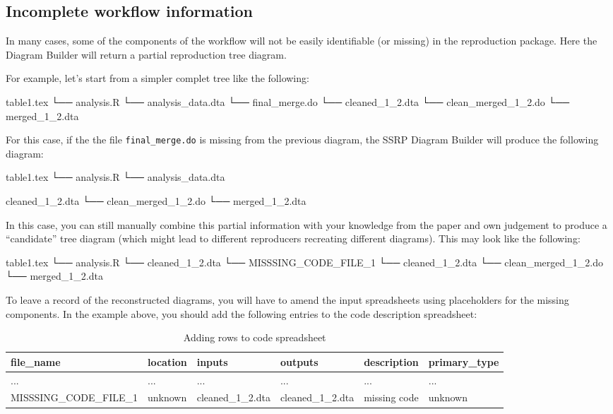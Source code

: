 \documentclass[
]{book}
\begin{document}
\hypertarget{incomplete-workflow-information}{%
\subsection{Incomplete workflow information}\label{incomplete-workflow-information}}

In many cases, some of the components of the workflow will not be easily identifiable (or missing) in the reproduction package. Here the Diagram Builder will return a partial reproduction tree diagram.

For example, let's start from a simpler complet tree like the following:

table1.tex
└── analysis.R
└── analysis\_data.dta
└── final\_merge.do
└── cleaned\_1\_2.dta
└── clean\_merged\_1\_2.do
└── merged\_1\_2.dta

For this case, if the the file \texttt{final\_merge.do} is missing from the previous diagram, the SSRP Diagram Builder will produce the following diagram:

table1.tex
└── analysis.R
└── analysis\_data.dta

cleaned\_1\_2.dta
└── clean\_merged\_1\_2.do
└── merged\_1\_2.dta

In this case, you can still manually combine this partial information with your knowledge from the paper and own judgement to produce a ``candidate'' tree diagram (which might lead to different reproducers recreating different diagrams). This may look like the following:

table1.tex
└── analysis.R
└── cleaned\_1\_2.dta
└── MISSSING\_CODE\_FILE\_1
└── cleaned\_1\_2.dta
└── clean\_merged\_1\_2.do
└── merged\_1\_2.dta

To leave a record of the reconstructed diagrams, you will have to amend the input spreadsheets using placeholders for the missing components. In the example above, you should add the following entries to the code description spreadsheet:

\begin{table}

\caption{\label{tab:adding-rows}Adding rows to code spreadsheet}
\centering
\begin{tabu} to 
\hline
file\_name & location & inputs & outputs & description & primary\_type\\
\hline
... & ... & ... & ... & ... & ...\\
\hline
MISSSING\_CODE\_FILE\_1 & unknown & cleaned\_1\_2.dta & cleaned\_1\_2.dta & missing code & unknown\\
\hline
\end{tabu}
\end{table}
\end{document}
